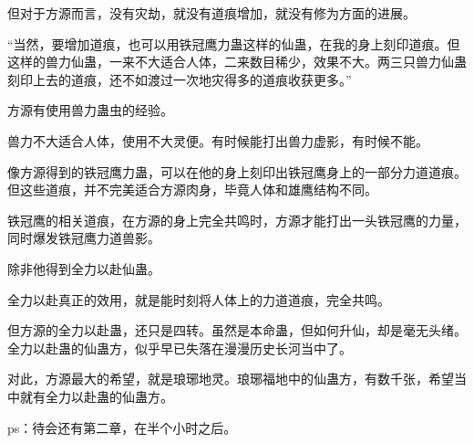 \begin{this_body}
但对于方源而言，没有灾劫，就没有道痕增加，就没有修为方面的进展。

“当然，要增加道痕，也可以用铁冠鹰力蛊这样的仙蛊，在我的身上刻印道痕。但这样的兽力仙蛊，一来不大适合人体，二来数目稀少，效果不大。两三只兽力仙蛊刻印上去的道痕，还不如渡过一次地灾得多的道痕收获更多。”

方源有使用兽力蛊虫的经验。

兽力不大适合人体，使用不大灵便。有时候能打出兽力虚影，有时候不能。

像方源得到的铁冠鹰力蛊，可以在他的身上刻印出铁冠鹰身上的一部分力道道痕。但这些道痕，并不完美适合方源肉身，毕竟人体和雄鹰结构不同。

铁冠鹰的相关道痕，在方源的身上完全共鸣时，方源才能打出一头铁冠鹰的力量，同时爆发铁冠鹰力道兽影。

除非他得到全力以赴仙蛊。

全力以赴真正的效用，就是能时刻将人体上的力道道痕，完全共鸣。

但方源的全力以赴蛊，还只是四转。虽然是本命蛊，但如何升仙，却是毫无头绪。全力以赴蛊的仙蛊方，似乎早已失落在漫漫历史长河当中了。

对此，方源最大的希望，就是琅琊地灵。琅琊福地中的仙蛊方，有数千张，希望当中就有全力以赴蛊的仙蛊方。

ps：待会还有第二章，在半个小时之后。

\end{this_body}

